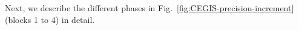 \documentclass[twocolumn]{autart}    %
\newtheorem{theorem}{Theorem}
\newtheorem{proof}{Proof}
\begin{document}
%
%

Next, we describe the different phases in Fig.~\ref{fig:CEGIS-precision-increment}
(blocks 1 to 4) in detail.
\end{document}
